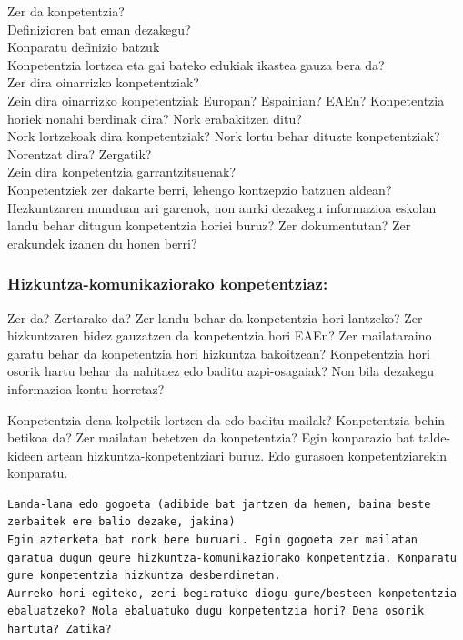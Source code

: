 \documentclass[
]{book}
\begin{document}
Zer da konpetentzia?\\
Definizioren bat eman dezakegu?\\
Konparatu definizio batzuk\\
Konpetentzia lortzea eta gai bateko edukiak ikastea gauza bera da?\\
Zer dira oinarrizko konpetentziak?\\
Zein dira oinarrizko konpetentziak Europan? Espainian? EAEn? Konpetentzia horiek nonahi berdinak dira? Nork erabakitzen ditu?\\
Nork lortzekoak dira konpetentziak? Nork lortu behar dituzte konpetentziak? Norentzat dira? Zergatik?\\
Zein dira konpetentzia garrantzitsuenak?\\
Konpetentziek zer dakarte berri, lehengo kontzepzio batzuen aldean?\\
Hezkuntzaren munduan ari garenok, non aurki dezakegu informazioa eskolan landu behar ditugun konpetentzia horiei buruz? Zer dokumentutan? Zer erakundek izanen du honen berri?

\hypertarget{hizkuntza-komunikaziorako-konpetentziaz}{%
\subsubsection{Hizkuntza-komunikaziorako konpetentziaz:}\label{hizkuntza-komunikaziorako-konpetentziaz}}

Zer da? Zertarako da? Zer landu behar da konpetentzia hori lantzeko? Zer hizkuntzaren bidez gauzatzen da konpetentzia hori EAEn? Zer mailataraino garatu behar da konpetentzia hori hizkuntza bakoitzean? Konpetentzia hori osorik hartu behar da nahitaez edo baditu azpi-osagaiak? Non bila dezakegu informazioa kontu horretaz?

Konpetentzia dena kolpetik lortzen da edo baditu mailak? Konpetentzia behin betikoa da? Zer mailatan betetzen da konpetentzia? Egin konparazio bat talde-kideen artean hizkuntza-konpetentziari buruz. Edo gurasoen konpetentziarekin konparatu.

\begin{verbatim}
Landa-lana edo gogoeta (adibide bat jartzen da hemen, baina beste zerbaitek ere balio dezake, jakina)
Egin azterketa bat nork bere buruari. Egin gogoeta zer mailatan garatua dugun geure hizkuntza-komunikaziorako konpetentzia. Konparatu gure konpetentzia hizkuntza desberdinetan. 
Aurreko hori egiteko, zeri begiratuko diogu gure/besteen konpetentzia ebaluatzeko? Nola ebaluatuko dugu konpetentzia hori? Dena osorik hartuta? Zatika?
\end{verbatim}
\end{document}
